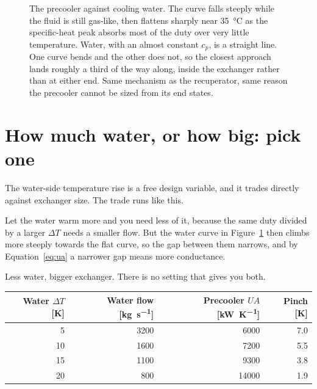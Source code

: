 \documentclass[11pt,a4paper]{report}
\begin{document}
\begin{figure}[htbp]
\centering
{}
\caption{The precooler against cooling water. The  curve falls
steeply while the fluid is still gas-like, then flattens sharply near
\SI{35}{\celsius} as the specific-heat peak absorbs most of the duty over
very little temperature. Water, with an almost constant $c_p$, is a straight
line. One curve bends and the other does not, so the closest approach lands
roughly a third of the way along, inside the exchanger rather than at either
end. Same mechanism as the recuperator, same reason the precooler cannot be
sized from its end states.}
\label{fig:precooler}
\end{figure}

\section{How much water, or how big: pick one}
\label{sec:watertrade}

The water-side temperature rise is a free design variable, and it trades
directly against exchanger size. The trade runs like this.

Let the water warm more and you need less of it, because the same duty
divided by a larger $\Delta T$ needs a smaller flow. But the water curve in
Figure~\ref{fig:precooler} then climbs more steeply towards the flat
 curve, so the gap between them narrows, and by
Equation~\eqref{eq:ua} a narrower gap means more conductance.

Less water, bigger exchanger. There is no setting that gives you both.

\begin{center}
\begin{tabular}{@{}rrrr@{}}
\toprule
Water $\Delta T$ [\si{\kelvin}] & Water flow [\si{\kilogram\per\second}]
  & Precooler $UA$ [\si{\kilo\watt\per\kelvin}] & Pinch [\si{\kelvin}] \\
\midrule
 5 & 3200 &  6000 & 7.0 \\
10 & 1600 &  7200 & 5.5 \\
15 & 1100 &  9300 & 3.8 \\
20 &  800 & 14000 & 1.9 \\
\bottomrule
\end{tabular}
\end{center}
\end{document}
